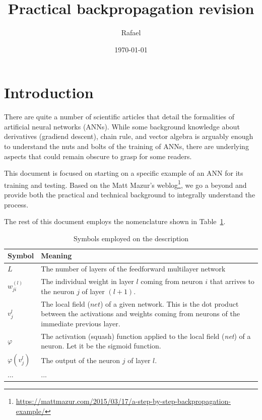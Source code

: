 \documentclass[10pt]{article}
\title{Practical backpropagation revision}
\author{Rafael}
\date{\today}
\begin{document}
\maketitle


\section{Introduction}
There are quite a number of scientific articles that detail the formalities of artificial neural networks (ANNs).
While some background knowledge about derivatives (gradiend descent), chain rule, and vector algebra is arguably enough to understand the nuts and bolts of the training of ANNs, there are underlying aspects that could remain obscure to grasp for some readers.

This document is focused on starting on a specific example of an ANN for its training and testing. 
Based on the Matt Mazur's weblog\footnote{\url{https://mattmazur.com/2015/03/17/a-step-by-step-backpropagation-example/}}, we go a beyond and provide both the practical and technical background to integrally understand the process.

The rest of this document employs the nomenclature shown in Table~\ref{tab:symbols}.

\begin{table}
\begin{tabular}{@{}p{}p{}@{}}
\toprule
\textbf{Symbol} & \textbf{Meaning} \\ \midrule
$L$ & The number of layers of the feedforward multilayer network \\
$w_{ji}^{(l)}$ & The individual weight in layer $l$ coming from neuron $i$ that arrives to the neuron $j$ of layer $(l+1)$. \\ 
$v_j^l$ & The local field ($net$) of a given network. This is the dot product between the activations and weights coming from neurons of the immediate previous layer. \\
$\varphi$ & The activation (squash) function applied to the local field (\emph{net}) of a neuron. Let it be the sigmoid function. \\
$\varphi(v_j^l)$ & The output of the neuron $j$ of layer $l$. \\
...& ...\\
\bottomrule
\end{tabular}%
\caption{Symbols employed on the description}
\label{tab:symbols}
\end{table}
\end{document}
